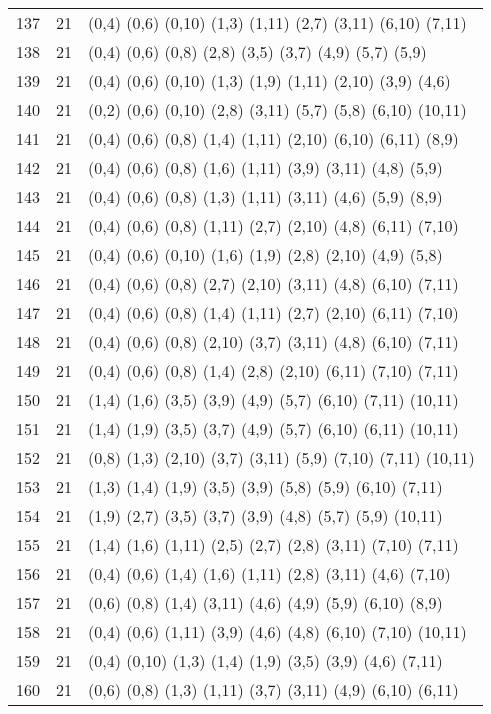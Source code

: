 {\begin{longtable}{lll}
137 & 21 & (0,4) (0,6) (0,10) (1,3) (1,11) (2,7) (3,11) (6,10) (7,11) \\
138 & 21 & (0,4) (0,6) (0,8) (2,8) (3,5) (3,7) (4,9) (5,7) (5,9) \\
139 & 21 & (0,4) (0,6) (0,10) (1,3) (1,9) (1,11) (2,10) (3,9) (4,6) \\
140 & 21 & (0,2) (0,6) (0,10) (2,8) (3,11) (5,7) (5,8) (6,10) (10,11) \\
141 & 21 & (0,4) (0,6) (0,8) (1,4) (1,11) (2,10) (6,10) (6,11) (8,9) \\
142 & 21 & (0,4) (0,6) (0,8) (1,6) (1,11) (3,9) (3,11) (4,8) (5,9) \\
143 & 21 & (0,4) (0,6) (0,8) (1,3) (1,11) (3,11) (4,6) (5,9) (8,9) \\
144 & 21 & (0,4) (0,6) (0,8) (1,11) (2,7) (2,10) (4,8) (6,11) (7,10) \\
145 & 21 & (0,4) (0,6) (0,10) (1,6) (1,9) (2,8) (2,10) (4,9) (5,8) \\
146 & 21 & (0,4) (0,6) (0,8) (2,7) (2,10) (3,11) (4,8) (6,10) (7,11) \\
147 & 21 & (0,4) (0,6) (0,8) (1,4) (1,11) (2,7) (2,10) (6,11) (7,10) \\
148 & 21 & (0,4) (0,6) (0,8) (2,10) (3,7) (3,11) (4,8) (6,10) (7,11) \\
149 & 21 & (0,4) (0,6) (0,8) (1,4) (2,8) (2,10) (6,11) (7,10) (7,11) \\
150 & 21 & (1,4) (1,6) (3,5) (3,9) (4,9) (5,7) (6,10) (7,11) (10,11) \\
151 & 21 & (1,4) (1,9) (3,5) (3,7) (4,9) (5,7) (6,10) (6,11) (10,11) \\
152 & 21 & (0,8) (1,3) (2,10) (3,7) (3,11) (5,9) (7,10) (7,11) (10,11) \\
153 & 21 & (1,3) (1,4) (1,9) (3,5) (3,9) (5,8) (5,9) (6,10) (7,11) \\
154 & 21 & (1,9) (2,7) (3,5) (3,7) (3,9) (4,8) (5,7) (5,9) (10,11) \\
155 & 21 & (1,4) (1,6) (1,11) (2,5) (2,7) (2,8) (3,11) (7,10) (7,11) \\
156 & 21 & (0,4) (0,6) (1,4) (1,6) (1,11) (2,8) (3,11) (4,6) (7,10) \\
157 & 21 & (0,6) (0,8) (1,4) (3,11) (4,6) (4,9) (5,9) (6,10) (8,9) \\
158 & 21 & (0,4) (0,6) (1,11) (3,9) (4,6) (4,8) (6,10) (7,10) (10,11) \\
159 & 21 & (0,4) (0,10) (1,3) (1,4) (1,9) (3,5) (3,9) (4,6) (7,11) \\
160 & 21 & (0,6) (0,8) (1,3) (1,11) (3,7) (3,11) (4,9) (6,10) (6,11) \\

\end{longtable}}
